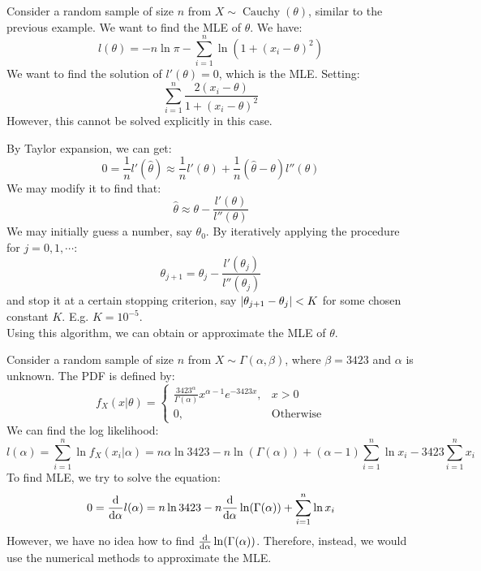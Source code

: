 \documentclass{huhtakm-template-book-v2}
\DeclareMathOperator{\Cauchy}{Cauchy}
\begin{document}
\newpage
\begin{eg}
	Consider a random sample of size $n$ from $X\sim\Cauchy(\theta)$, similar to the previous example. We want to find the MLE of $\theta$. We have:
	\begin{equation*}
		l(\theta)=-n\ln{\pi}-\sum_{i=1}^{n}\ln(1+(x_{i}-\theta)^{2})
	\end{equation*}
	We want to find the solution of $l'(\theta)=0$, which is the MLE. Setting:
	\begin{equation*}
		\sum_{i=1}^{n}\frac{2(x_{i}-\theta)}{1+(x_{i}-\theta)^{2}}
	\end{equation*}
	However, this cannot be solved explicitly in this case.
\end{eg}
\begin{eg}
	By Taylor expansion, we can get:
	\begin{equation*}
		0=\frac{1}{n}l'(\hat{\theta})\approx\frac{1}{n}l'(\theta)+\frac{1}{n}(\hat{\theta}-\theta)l''(\theta)
	\end{equation*}
	We may modify it to find that:
	\begin{equation*}
		\hat{\theta}\approx\theta-\frac{l'(\theta)}{l''(\theta)}
	\end{equation*}
	We may initially guess a number, say $\theta_{0}$. By iteratively applying the procedure for $j=0,1,\cdots$:
	\begin{equation*}
		\theta_{j+1}=\theta_{j}-\frac{l'(\theta_{j})}{l''(\theta_{j})}
	\end{equation*}
	and stop it at a certain stopping criterion, say $\left|{\theta_{j+1}-\theta_{j}}\right|<K$ for some chosen constant $K$. E.g. $K=10^{-5}$.\\
	Using this algorithm, we can obtain or approximate the MLE of $\theta$.
\end{eg}
\begin{eg}
	Consider a random sample of size $n$ from $X\sim\Gamma(\alpha,\beta)$, where $\beta=3423$ and $\alpha$ is unknown. The PDF is defined by:
	\begin{equation*}
		f_{X}(x|\theta)=\begin{cases}
			\frac{3423^{\alpha}}{\Gamma(\alpha)}x^{\alpha-1}e^{-3423x}, &x>0\\
			0, &\text{Otherwise}
		\end{cases}
	\end{equation*}
	We can find the log likelihood:
	\begin{equation*}
		l(\alpha)=\sum_{i=1}^{n}\ln{f_{X}(x_{i}|\alpha)}=n\alpha\ln{3423}-n\ln(\Gamma(\alpha))+(\alpha-1)\sum_{i=1}^{n}\ln{x_{i}}-3423\sum_{i=1}^{n}x_{i}
	\end{equation*}
	To find MLE, we try to solve the equation:
	\begin{equation*}
		0=\odv*{}{\alpha}l(\alpha)=n\ln{3423}-n\odv*{}{\alpha}\ln(\Gamma(\alpha))+\sum_{i=1}^{n}\ln{x_{i}}
	\end{equation*}
	However, we have no idea how to find $\odv*{}{\alpha}\ln(\Gamma(\alpha))$. Therefore, instead, we would use the numerical methods to approximate the MLE.
\end{eg}
\end{document}
